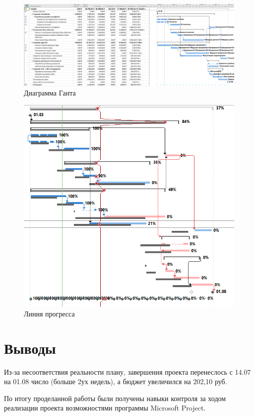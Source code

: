 \begin{figure}[!h]
\centering
\includegraphics[width=1\linewidth]{inc/img/3.png}
\caption{Диаграмма Ганта}
\label{p3}
\end{figure}

\newpage
\begin{figure}[!h]
	\centering
	\includegraphics[width=1\linewidth]{inc/img/4.png}
	\caption{Линия прогресса}
	\label{p4}
\end{figure}

\section*{Выводы}
Из-за несоответствия реальности плану, завершения проекта перенеслось с 14.07 на 01.08 число (больше 2ух недель), а бюджет увеличился на 202,10 руб.

По итогу проделанной работы были получены навыки контроля за ходом реализации проекта возможностями программы Microsoft Project.